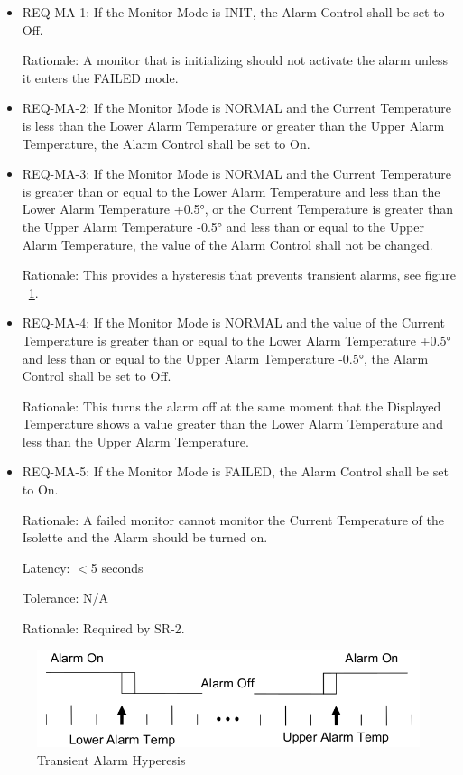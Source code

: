 \begin{itemize}
\item REQ-MA-1: If the Monitor Mode is INIT, the Alarm Control shall be set to Off.

      Rationale: A monitor that is initializing should not activate the alarm unless it enters the
      FAILED mode.
\item REQ-MA-2: If the Monitor Mode is NORMAL and the Current Temperature is less than
      the Lower Alarm Temperature or greater than the Upper Alarm Temperature, the Alarm
      Control shall be set to On.
\item REQ-MA-3: If the Monitor Mode is NORMAL and the Current Temperature is greater
      than or equal to the Lower Alarm Temperature and less than the Lower Alarm
      Temperature +0.5°, or the Current Temperature is greater than the Upper Alarm
      Temperature -0.5° and less than or equal to the Upper Alarm Temperature, the value of
      the Alarm Control shall not be changed.

      Rationale: This provides a hysteresis that prevents transient alarms, see figure ~\ref{fig:alarm-hyperesis}.
\item REQ-MA-4: If the Monitor Mode is NORMAL and the value of the Current
      Temperature is greater than or equal to the Lower Alarm Temperature +0.5° and less than
      or equal to the Upper Alarm Temperature -0.5°, the Alarm Control shall be set to Off.

      Rationale: This turns the alarm off at the same moment that the Displayed Temperature
      shows a value greater than the Lower Alarm Temperature and less than the Upper Alarm
      Temperature.
\item REQ-MA-5: If the Monitor Mode is FAILED, the Alarm Control shall be set to On.

      Rationale: A failed monitor cannot monitor the Current Temperature of the Isolette and
      the Alarm should be turned on.

      Latency: $<$5 seconds

      Tolerance: N/A

      Rationale: Required by SR-2.
\end{itemize}

\begin{figure}[ht]
  \centerline{\includegraphics[width=\textwidth]{figures/transient-alarm-hysteresis.png}}
  \vspace{-.4cm}
  \caption{Transient Alarm Hyperesis}
  \vspace{-.4cm}
 \label{fig:alarm-hyperesis}
\end{figure}

